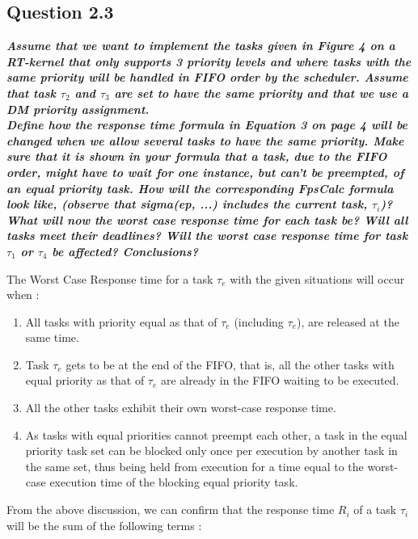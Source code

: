 \documentclass[oneside,a4paper]{article}
\begin{document}
\subsection*{\normalsize{Question 2.3}}
\textit{\textbf{Assume that we want to implement the tasks given in Figure 4 on a RT-kernel that only supports 3 priority levels and where tasks with the same priority will be handled in FIFO order by the scheduler. Assume that task $\tau_2$ and $\tau_3$ are set to have the same priority and that we use a DM priority assignment.\\
Define how the response time formula in Equation 3 on page 4 will be changed when we allow several tasks to have the same priority. Make sure that it is shown in your formula that a task, due to the FIFO order, might have to wait for one instance, but can’t be preempted, of an equal priority task. How will the corresponding FpsCalc formula look like, (observe that sigma(ep, ...) includes the current task, $\tau_i$)?\\
What will now the worst case response time for each task be? Will all tasks meet their deadlines? Will the worst case response time for task $\tau_1$ or $\tau_4$ be affected? Conclusions?}}\par
The Worst Case Response time for a task \textit{$\tau_e$} with the given situations will occur when :
\begin{enumerate}
    \item All tasks with priority equal as that of \textit{$\tau_e$} (including \textit{$\tau_e$}), are released at the same time.
    \item Task \textit{$\tau_e$} gets to be at the end of the FIFO, that is, all the other tasks with equal priority as that of \textit{$\tau_e$} are already in the FIFO waiting to be executed. \\
    \item All the other tasks exhibit their own worst-case response time.
    \item As tasks with equal priorities cannot preempt each other, a task in the equal priority task set can be blocked only once per execution by another task in the same set, thus being held from execution for a time equal to the worst-case execution time of the blocking equal priority task.
\end{enumerate}\par
From the above discussion, we can confirm that the response time $R_i$ of a task $\tau_i$ will be the sum of the following terms :
\end{document}
